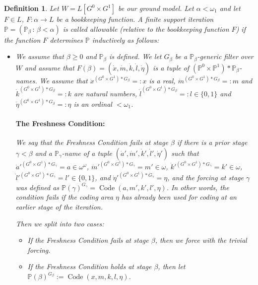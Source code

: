 \documentclass[a4paper,11pt]{article}
\newtheorem{definition}[theorem]{Definition}
\newcommand{\forceP}{\mathbb{P}}
\begin{document}
\begin{definition}\label{def:allowable}
Let $W=L[G^0 \times G^1]$ be our ground model. Let $\alpha < \omega_1$ and let $F\in L$, $F: \alpha \rightarrow L$ be a bookkeeping function.
A finite support iteration $\forceP=(\forceP_{\beta}\,:\, {\beta< \alpha})$ is called allowable (relative to the bookkeeping function $F$) if the function $F$ determines $\forceP$ inductively as follows:
 \begin{itemize}
 \item[] We assume that $\beta \ge 0$ and $\forceP_{\beta}$ is defined.
 We let $G_{\beta}$ be a $\forceP_{\beta}$-generic filter over $W$ and assume that $F(\beta)=(\dot{x},\dot{m},\dot{k}, \dot{l}, \dot{\eta})$ is a tuple of $(\forceP^0 \times\forceP^1) \ast \forceP_{\beta}$-names. We assume that $\dot{x}^{(G^0 \times G^1)\ast G_{\beta}}=:x$ is a real, $\dot{m}^{(G^0 \times G^1)\ast G_{\beta}}=:m $ and $\dot{k}^{(G^0 \times G^1)\ast G_{\beta}}=:k$ are natural numbers, $\dot{l}^{(G^0 \times G^1)\ast G_{\beta}}=:l \in \{0,1\}$ and $\dot{\eta}^{(G^0 \times G^1)\ast G_{\beta}}=:\eta$ is an ordinal $< \omega_1$. 
 
 \paragraph{The Freshness Condition:} We say that the \emph{Freshness Condition} fails at stage $\beta$ if there is a prior stage $\gamma < \beta$ and a $\forceP_{\gamma}$-name of a tuple $(\dot{a}', \dot{m}', \dot{k}', \dot{l}' ,\dot{\eta}') $ such that $\dot{a}'^{(G^0 \times G^1)\ast G_{\gamma}}= a \in \omega^{\omega}$, $\dot{m}'^{(G^0 \times G^1)\ast G_{\gamma}}= m' \in \omega$, $\dot{k}'^{(G^0 \times G^1)\ast G_{\gamma}}=k' \in \omega$, $\dot{l}'^{(G^0 \times G^1)\ast G_{\gamma}}=l' \in \{0,1\}$, and $\dot{\eta}'^{(G^0 \times G^1)\ast G_{\gamma}} = \eta$, and the forcing at stage $\gamma$ was defined as $\forceP(\gamma)^{G_{\gamma}} = \operatorname{Code}(a, m', k', l', \eta)$. In other words, the condition fails if the coding area $\eta$ has already been used for coding at an earlier stage of the iteration.
 
 Then we split into two cases:
 \begin{itemize}
 \item If the Freshness Condition fails at stage $\beta$, then we force with the trivial forcing.
 \item If the Freshness Condition holds at stage $\beta$, then let $\forceP(\beta)^{G_{\beta}}:= \operatorname{Code} (x,m,k,l,\eta)$.
 \end{itemize}
 \end{itemize}
\end{definition}
\end{document}
